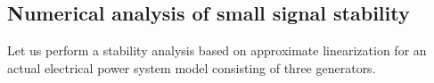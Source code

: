 \documentclass[graybox, envcountchap]{svmult}
\begin{document}
\subsection{Numerical analysis of small signal stability}

Let us perform a stability analysis based on approximate linearization for an actual electrical power system model consisting of three generators.

%
\end{document}
